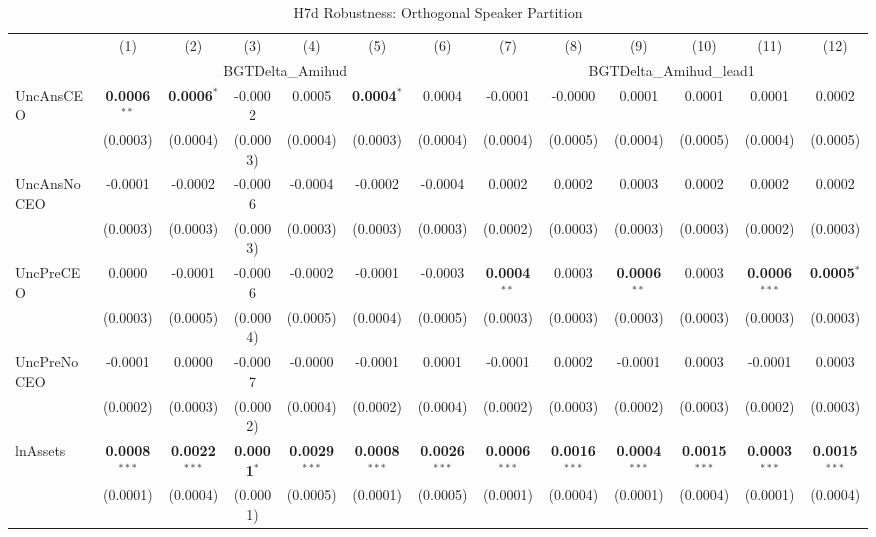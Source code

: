 \begin{landscape}
\begin{table}[H]
\setlength{\tabcolsep}{3pt}
\renewcommand{\arraystretch}{0.85}
\centering
\caption{H7d Robustness: Orthogonal Speaker Partition}
\label{tab:h7d_robust}
\scriptsize
\begin{tabular}{lcccccccccccc}
\toprule
 & (1) & (2) & (3) & (4) & (5) & (6) & (7) & (8) & (9) & (10) & (11) & (12) \\
 & \multicolumn{6}{c}{BGTDelta\_Amihud} & \multicolumn{6}{c}{BGTDelta\_Amihud\_lead1} \\
\cmidrule(lr){2-7} \cmidrule(lr){8-13}
\midrule
UncAnsCEO & \textbf{0.0006}$^{**}$ & \textbf{0.0006}$^{*}$ & -0.0002 & 0.0005 & \textbf{0.0004}$^{*}$ & 0.0004 & -0.0001 & -0.0000 & 0.0001 & 0.0001 & 0.0001 & 0.0002 \\
 & (0.0003) & (0.0004) & (0.0003) & (0.0004) & (0.0003) & (0.0004) & (0.0004) & (0.0005) & (0.0004) & (0.0005) & (0.0004) & (0.0005) \\
UncAnsNoCEO & -0.0001 & -0.0002 & -0.0006 & -0.0004 & -0.0002 & -0.0004 & 0.0002 & 0.0002 & 0.0003 & 0.0002 & 0.0002 & 0.0002 \\
 & (0.0003) & (0.0003) & (0.0003) & (0.0003) & (0.0003) & (0.0003) & (0.0002) & (0.0003) & (0.0003) & (0.0003) & (0.0002) & (0.0003) \\
UncPreCEO & 0.0000 & -0.0001 & -0.0006 & -0.0002 & -0.0001 & -0.0003 & \textbf{0.0004}$^{**}$ & 0.0003 & \textbf{0.0006}$^{**}$ & 0.0003 & \textbf{0.0006}$^{***}$ & \textbf{0.0005}$^{*}$ \\
 & (0.0003) & (0.0005) & (0.0004) & (0.0005) & (0.0004) & (0.0005) & (0.0003) & (0.0003) & (0.0003) & (0.0003) & (0.0003) & (0.0003) \\
UncPreNoCEO & -0.0001 & 0.0000 & -0.0007 & -0.0000 & -0.0001 & 0.0001 & -0.0001 & 0.0002 & -0.0001 & 0.0003 & -0.0001 & 0.0003 \\
 & (0.0002) & (0.0003) & (0.0002) & (0.0004) & (0.0002) & (0.0004) & (0.0002) & (0.0003) & (0.0002) & (0.0003) & (0.0002) & (0.0003) \\
\midrule
lnAssets & \textbf{0.0008}$^{***}$ & \textbf{0.0022}$^{***}$ & \textbf{0.0001}$^{*}$ & \textbf{0.0029}$^{***}$ & \textbf{0.0008}$^{***}$ & \textbf{0.0026}$^{***}$ & \textbf{0.0006}$^{***}$ & \textbf{0.0016}$^{***}$ & \textbf{0.0004}$^{***}$ & \textbf{0.0015}$^{***}$ & \textbf{0.0003}$^{***}$ & \textbf{0.0015}$^{***}$ \\
 & (0.0001) & (0.0004) & (0.0001) & (0.0005) & (0.0001) & (0.0005) & (0.0001) & (0.0004) & (0.0001) & (0.0004) & (0.0001) & (0.0004) \\

\end{tabular}
\end{table}
\end{landscape}
